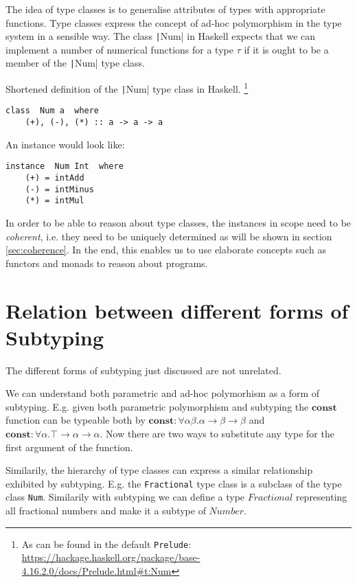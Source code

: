 The idea of type classes is to generalise attributes of types with appropriate functions.
Type classes express the concept of ad-hoc polymorphism in the type system in a sensible  way.
The class \texttt|Num| in Haskell expects that we can implement a number of numerical functions for a type $\tau$ if it is ought to be a member of the \texttt|Num| type class.

Shortened definition of the \texttt|Num| type class in Haskell.
\footnote{As can be found in the default \texttt{Prelude}: \url{https://hackage.haskell.org/package/base-4.16.2.0/docs/Prelude.html\#t:Num}}

\begin{verbatim}
class  Num a  where
    (+), (-), (*) :: a -> a -> a
\end{verbatim}

An instance would look like:

\begin{verbatim}
instance  Num Int  where
    (+) = intAdd
    (-) = intMinus
    (*) = intMul
\end{verbatim}


In order to be able to reason about type classes, the instances in scope need to be \emph{coherent}, i.e. they need to be uniquely determined as will be shown in section \ref{sec:coherence}.
In the end, this enables us to use elaborate concepts such as functors and monads to reason about programs.

\cite{wadlerblott}

\section{Relation between different forms of Subtyping}\label{sec:relations}

The different forms of subtyping just discussed are not unrelated.

We can understand both parametric and ad-hoc polymorhism as a form of subtyping.
E.g. given both parametric polymorphism and subtyping the $\mathbf{const}$ function can be typeable both by
$\mathbf{const} : \forall \alpha \beta. \alpha \to \beta \to \beta$ and $\mathbf{const} : \forall \alpha. \top \to \alpha \to \alpha$.
Now there are two ways to substitute any type for the first argument of the function.

Similarily, the hierarchy of type classes can express a similar relationship exhibited by subtyping.
E.g. the \texttt{Fractional} type class is a subclass of the type class \texttt{Num}.
Similarily with subtyping we can define a type $\mathit{Fractional}$ representing all fractional numbers and make it a subtype of $\mathit{Number}$.

